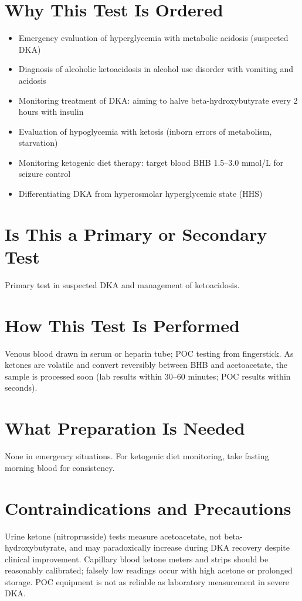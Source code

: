 \section*{Why This Test Is Ordered}
\begin{itemize}
  \item Emergency evaluation of hyperglycemia with metabolic acidosis (suspected DKA)
  \item Diagnosis of alcoholic ketoacidosis in alcohol use disorder with vomiting and acidosis
  \item Monitoring treatment of DKA: aiming to halve beta-hydroxybutyrate every 2 hours with insulin
  \item Evaluation of hypoglycemia with ketosis (inborn errors of metabolism, starvation)
  \item Monitoring ketogenic diet therapy: target blood BHB 1.5--3.0 mmol/L for seizure control
  \item Differentiating DKA from hyperosmolar hyperglycemic state (HHS)
\end{itemize}

\section*{Is This a Primary or Secondary Test}
Primary test in suspected DKA and management of ketoacidosis.

\section*{How This Test Is Performed}
Venous blood drawn in serum or heparin tube; POC testing from fingerstick. As ketones are volatile and convert reversibly between BHB and acetoacetate, the sample is processed soon (lab results within 30--60 minutes; POC results within seconds).

\section*{What Preparation Is Needed}
None in emergency situations. For ketogenic diet monitoring, take fasting morning blood for consistency.

\section*{Contraindications and Precautions}
Urine ketone (nitroprusside) tests measure acetoacetate, not beta-hydroxybutyrate, and may paradoxically increase during DKA recovery despite clinical improvement. Capillary blood ketone meters and strips should be reasonably calibrated; falsely low readings occur with high acetone or prolonged storage. POC equipment is not as reliable as laboratory measurement in severe DKA.


